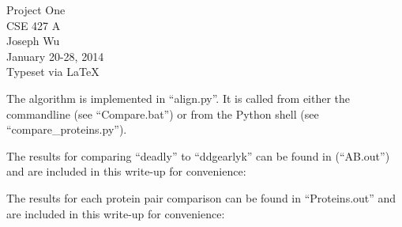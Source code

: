 \documentclass[a4paper, 12pt]{report}
\begin{document}
    \begin{center}
        {\LARGE Project One} \\
        CSE 427 A \\
        Joseph Wu  \\
        January 20-28, 2014 \\
        {\tiny Typeset via \LaTeX}
    \end{center}
    
    The algorithm is implemented in ``align.py''.  
    It is called from either the commandline (see ``Compare.bat'') 
        or from the Python shell (see ``compare\_proteins.py'').
    
    The results for comparing ``deadly'' to ``ddgearlyk'' can be found in (``AB.out'')
    and are included in this write-up for convenience:
    
    
    \pagebreak
    The results for each protein pair comparison can be found in ``Proteins.out''
    and are included in this write-up for convenience:
    
\end{document}
